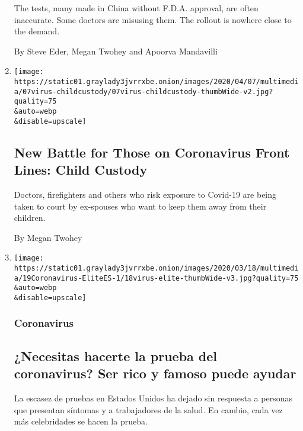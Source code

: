\begin{enumerate}
  The tests, many made in China without F.D.A. approval, are often
  inaccurate. Some doctors are misusing them. The rollout is nowhere
  close to the demand.

  By Steve Eder, Megan Twohey and Apoorva Mandavilli
\item
  \href{/2020/04/07/us/coronavirus-child-custody.html}{}

  \texttt{[image: https://static01.graylady3jvrrxbe.onion/images/2020/04/07/multimedia/07virus-childcustody/07virus-childcustody-thumbWide-v2.jpg?quality=75\\\&auto=webp\\\&disable=upscale]}

  \hypertarget{new-battle-for-those-on-coronavirus-front-lines-child-custody}{%
  \subsection{New Battle for Those on Coronavirus Front Lines: Child
  Custody}\label{new-battle-for-those-on-coronavirus-front-lines-child-custody}}

  Doctors, firefighters and others who risk exposure to Covid-19 are
  being taken to court by ex-spouses who want to keep them away from
  their children.

  By Megan Twohey
\item
  \href{/es/2020/03/19/espanol/coronavirus-celebridades.html}{}

  \texttt{[image: https://static01.graylady3jvrrxbe.onion/images/2020/03/18/multimedia/19Coronavirus-EliteES-1/18virus-elite-thumbWide-v3.jpg?quality=75\\\&auto=webp\\\&disable=upscale]}

  \hypertarget{coronavirus}{%
  \subsubsection{Coronavirus}\label{coronavirus}}

  \hypertarget{necesitas-hacerte-la-prueba-del-coronavirus-ser-rico-y-famoso-puede-ayudar}{%
  \subsection{¿Necesitas hacerte la prueba del coronavirus? Ser rico y
  famoso puede
  ayudar}\label{necesitas-hacerte-la-prueba-del-coronavirus-ser-rico-y-famoso-puede-ayudar}}

  La escasez de pruebas en Estados Unidos ha dejado sin respuesta a
  personas que presentan síntomas y a trabajadores de la salud. En
  cambio, cada vez más celebridades se hacen la prueba.


\end{enumerate}
